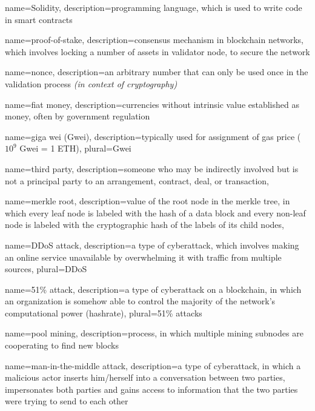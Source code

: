 {
    name=Solidity,
    description={programming language, which is used to write code in smart contracts}
}

{
    name=proof-of-stake,
    description={consensus mechanism in blockchain networks, which involves locking a number of assets in validator node, to secure the network}
}

{
    name=nonce,
    description={an arbitrary number that can only be used once in the validation process \textit{(in context of cryptography)}}
}

{
    name=fiat money,
    description={currencies without intrinsic value established as money, often by government regulation}
}

{
    name=giga wei (Gwei),
    description={typically used for assignment of gas price ($10^9$ Gwei = 1 ETH)},
    plural=Gwei
}

{
    name=third party,
    description={someone who may be indirectly involved but is not a principal party to an arrangement, contract, deal, or transaction},
}

{
    name=merkle root,
    description={value of the root node in the merkle tree, in which every leaf node is labeled with the hash of a data block and every non-leaf node is labeled with the cryptographic hash of the labels of its child nodes},
}

{
    name=DDoS attack,
    description={a type of cyberattack, which involves making an online service unavailable by overwhelming it with traffic from multiple sources},
    plural=DDoS
}

{
    name=51\% attack,
    description={a type of cyberattack on a blockchain, in which an organization is somehow able to control the majority of the network's computational power (hashrate)},
    plural=51\% attacks
}

{
    name=pool mining,
    description={process, in which multiple mining subnodes are cooperating to find new blocks}
}

{
    name=man-in-the-middle attack,
    description={a type of cyberattack, in which a malicious actor inserts him/herself into a conversation between two parties, impersonates both parties and gains access to information that the two parties were trying to send to each other}
}

